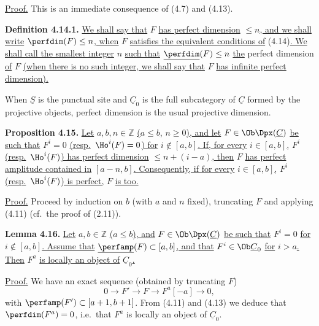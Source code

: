 \uline{Proof.} This is an immediate consequence of (4.7) and (4.13).

\textbf{Definition 4.14.1.} \uline{We shall say that} \(F\) \uline{has perfect dimension} \(\leq n\)\uline{, and we shall write} \(\perfdim(F)\leq n\)\uline{, when} \(F\) \uline{satisfies the equivalent conditions of} (4.14)\uline{. We shall call the smallest integer} \(n\) \uline{such that} \(\underline{\perfdim}(F)\leq n\) \uline{the} perfect dimension \uline{of} \(F\) \uline{(when there is no such integer, we shall say that} \(F\) \uline{has infinite perfect dimension).}

When \(\underline{S}\) is the punctual site and \(\underline{C}_0\) is the full subcategory of \(\underline{C}\) formed by the projective objects, perfect dimension is the usual projective dimension.

\textbf{Proposition 4.15.} \uline{Let} \(a,b,n\in\mathbb Z\) \uline{(}\(a\leq b\)\uline{,} \(n\geq0\)\uline{), and let} \(F\in\Ob\Dpx(\underline{C})\) \uline{be such that} \(F^i=0\) \uline{(resp.}\ \(\Ho^i(F)=0\)\uline{) for} \(i\notin[a,b]\)\uline{. If, for every} \(i\in[a,b]\)\uline{,} \(F^i\) \uline{(resp.}\ \(\Ho^i(F)\)\uline{) has perfect dimension} \(\leq n+(i-a)\)\uline{, then} \(F\) \uline{has perfect amplitude contained in} \([a-n,b]\)\uline{. Consequently, if for every} \(i\in[a,b]\)\uline{,} \(F^i\) \uline{(resp.}\ \(\Ho^i(F)\)\uline{) is perfect,} \(F\) \uline{is too.}

%
\uline{Proof.} Proceed by induction on \(b\) (with \(a\) and \(n\) fixed), truncating \(F\) and applying (4.11) (cf.\ the proof of (2.11)).

\textbf{Lemma 4.16.} \uline{Let} \(a,b\in\mathbb Z\) \uline{(}\(a\leq b\)\uline{), and} \(F\in\Ob\Dpx(\underline{C})\) \uline{be such that} \(F^i=0\) \uline{for} \(i\notin[a,b]\)\uline{. Assume that} \(\underline{\perfamp}(F)\subset[a,b]\)\uline{, and that} \(F^i\in\Ob\underline{C}_0\) \uline{for} \(i>a\)\uline{. Then} \(F^a\) \uline{is locally an object of} \(\underline{C}_0\)\uline{.}

\uline{Proof.} We have an exact sequence (obtained by truncating \(F\))
\[
  0\longrightarrow F'\longrightarrow F\longrightarrow F^a[-a]\longrightarrow 0,
\]
with \(\perfamp(F')\subset[a+1,b+1]\). From (4.11) and (4.13) we deduce that \(\perfdim(F^a)=0\), i.e.\ that \(F^a\) is locally an object of \(\underline{C}_0\).

